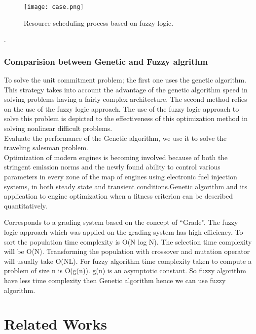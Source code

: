 \documentclass[a4paper,12pt]{report}
\begin{document}
{{{{\begin{figure}[h]
	\begin{center}
		\texttt{[image: case.png]}\\
	\end{center}
	\caption{ Resource scheduling process based on fuzzy logic.}
\end{figure}	.
		 
\pagebreak
		    \subsection{Comparision between Genetic and Fuzzy algrithm}
		To solve the unit commitment problem; the first one uses the genetic algorithm. This strategy takes into account the advantage of the genetic algorithm speed in solving problems having a fairly complex architecture. The second method relies on the use of the fuzzy logic approach. The use of the fuzzy logic approach to solve this problem is depicted to the effectiveness of this optimization method in solving nonlinear difficult problems.\\
		
		Evaluate the performance of the Genetic algorithm, we use it to solve the traveling salesman problem.
		\\
		Optimization of modern engines is becoming involved because of both the stringent emission norms and the newly found ability to control various parameters in every zone of the map of engines using electronic fuel injection systems, in both steady state and transient conditions.Genetic algorithm and its application to engine optimization when a fitness criterion can be described quantitatively.
		
		\par Corresponds to a grading system based on the concept of “Grade”. The fuzzy 
		logic approach which was applied on the grading system has high efficiency.
		To sort the population time complexity is O(N log N). The selection time complexity will be O(N).
		Transforming the population with crossover and mutation operator will usually take O(NL).
		For fuzzy algorithm time complexity  
		taken to compute a problem of size n is O(g(n)).
		g(n) is an asymptotic constant.
		So fuzzy algorithm have less time complexity then Genetic algorithm hence we can use fuzzy algorithm. 
		
		\pagebreak

		\chapter{Related Works}
}}}}
\end{document}

